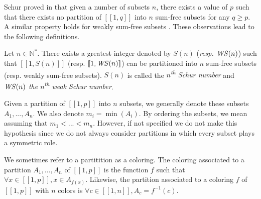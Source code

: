 \par
Schur proved in \cite{Schur1917} that given a number of subsets \(n\), there exists a value of \(p\)
such that there exists no partition of \([\![1,q]\!]\) into \(n\) sum-free subsets for any \(q \geqslant p\). A similar
property holds for weakly sum-free subsets \cite{Irving1973}. These observations lead to the following definitions.

\begin{definition}
Let \(n \in \mathbb{N}^*\). There exists a greatest integer denoted by \(S(n)\) (\textit{resp. \(\mathit{WS} (n)\)}) such that
\([\![1,S(n)]\!]\) (resp. \([\![1, \mathit{WS} (n)]\!]\)) can be partitioned into \(n\) sum-free subsets (resp. weakly sum-free
subsets). \(S(n)\) is called the \textit{\(n\)\textsuperscript{th} Schur number} and \textit{\(\mathit{WS} (n)\) the
\(n\)\textsuperscript{th} weak Schur number}.
\end{definition}

Given a partition of \([\![1, p]\!]\) into \(n\) subsets, we generally denote these subsets \(A_1, ..., A_n\). We also denote
\(m_i = \min(A_i)\). By ordering the subsets, we mean assuming that \(m_1 < ... < m_n\). However, if not specified we do 
not make this hypothesis since we do not always consider partitions in which every subset plays a symmetric role.

\begin{definition}
We sometimes refer to a partitition as a coloring. The coloring associated to a partition \(A_1, ..., A_n\) of 
\([\![1, p]\!]\) is the function \(f\) such that \(\forall x \in [\![1, p]\!], x \in A_{f(x)}\). Likewise, the partition associated to
a coloring \(f\) of \([\![1, p]\!]\) with \(n\) colors is \(\forall c \in [\![1, n]\!], A_c = f^{-1}(c)\).
\end{definition}
